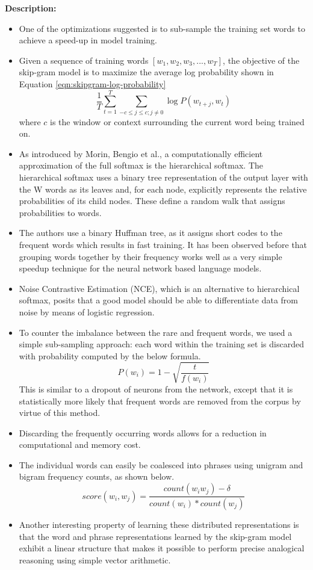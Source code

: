 \documentclass[11pt,a4paper]{article}
\begin{document}
  \textbf{Description:}
  \begin{itemize}
    \item
    One of the optimizations suggested is to sub-sample the training set words to achieve a speed-up in model training.
    \item
    Given a sequence of training words $[w_1 , w_2 , w_3 , ... , w_T]$, the objective of the skip-gram model is to maximize the average log probability shown in Equation \ref{eqn:skipgram-log-probability}
    \begin{equation} \label{eqn:skipgram-log-probability}
      \frac{1}{T} \sum_{t=1}^T \sum_{-c \leq j \leq c; j \neq 0} \log P(w_{t+j}, w_t)
    \end{equation}
    where $c$ is the window or context surrounding the current word being trained on.
    \item
    As introduced by Morin, Bengio et al.\cite{morin2005hierarchical}, a computationally efficient approximation of the full softmax is the hierarchical softmax. The hierarchical softmax uses a binary tree representation of the output layer with the W words as its leaves and, for each node, explicitly represents the relative probabilities of its child nodes. These define a random walk that assigns probabilities to words.
    \item
    The authors use a binary Huffman tree, as it assigns short codes to the frequent words which results in fast training. It has been observed before that grouping words together by their frequency works well as a very simple speedup technique for the neural network based language models.
    \item
    Noise Contrastive Estimation (NCE), which is an alternative to hierarchical softmax,  posits that a good model should be able to differentiate data from noise by means of logistic regression.
    \item
    To counter the imbalance between the rare and frequent words, we used a simple sub-sampling approach: each word within the training set is discarded with probability computed by the below formula.
    $$P(w_i) = 1 - \sqrt{\frac{t}{f(w_i)}} $$
    This is similar to a dropout of neurons from the network, except that it is statistically more likely that frequent words are removed from the corpus by virtue of this method.
    \item
    Discarding the frequently occurring words allows for a reduction in computational and memory cost.
    \item
    The individual words can easily be coalesced into phrases using unigram and bigram frequency counts, as shown below.
    $$score(w_i, w_j) = \frac{count(w_i w_j) - \delta}{count(w_i) * count(w_j)} $$
    \item
    Another interesting property of learning these distributed representations is that the word and phrase representations learned by the skip-gram model exhibit a linear structure that makes it possible to perform precise analogical reasoning using simple vector arithmetic.
  \end{itemize}
\end{document}
